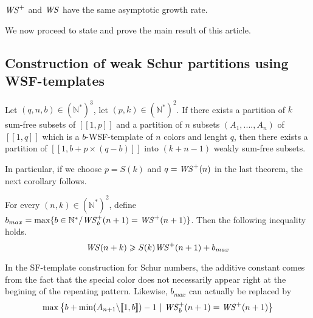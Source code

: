 \begin{remark}
	\(\mathit{WS}^+\) and \(\mathit{WS}\) have the same asymptotic growth rate.
\end{remark}

We now proceed to state and prove the main result of this article.


\subsection{Construction of weak Schur partitions using WSF-templates}

\begin{theorem}
Let \((q,n,b) \in (\mathbb{N}^*)^3\), let \( (p,k) \in (\mathbb{N}^*)^2\). If there exists a partition of \(k\)
sum-free subsets of \([\![1,p]\!]\) and a partition of \(n\) subsets \((A_1,....,A_n)\) of \([\![1, q]\!]\) which is a
\(b\)-WSF-template of \(n\) colors and lenght \(q\),
 then there exists a partition of \([\![1, b+p \times (q-b)]\!]\) into \((k+n-1)\) weakly sum-free subsets.
\end{theorem}

In particular, if we choose \(p = S(k)\) and \(q = \mathit{WS}^+(n)\) in the last theorem, the next corollary follows.

\begin{corollary}
For every \((n,k) \in (\mathbb{N}^*)^2\), define \( b_{max} = \max \{b\in \mathbb{N}^*/ \mathit{WS}_b^+(n+1) = \mathit{WS}^+(n+1)\}\).
Then the following inequality holds.
\[\mathit{WS}(n+k) \geqslant S(k) \mathit{WS}^+(n+1)+b_{max}\]
\end{corollary}

\begin{remark}
In the SF-template construction for Schur numbers, the additive constant comes from the fact that the special color does
not necessarily appear right at the begining of the repeating pattern. Likewise, \(b_{max}\) can actually be replaced by \\
\[\max \left\{ b + \min (A_{n+1} \backslash [\![1, b ]\!]) - 1~|~ \mathit{WS}_b^+(n+1) = \mathit{WS}^+(n+1) \right\}\]
\end{remark}

